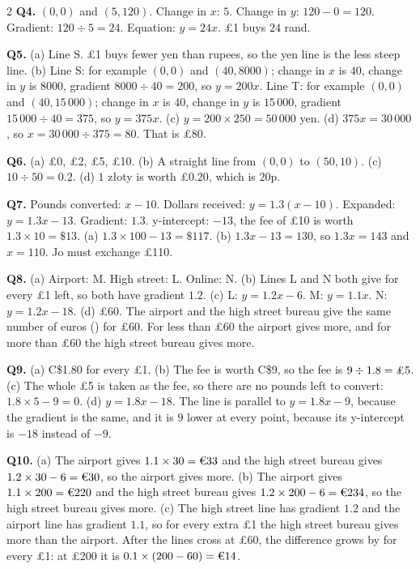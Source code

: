 \documentclass[12pt,a4paper]{article}
\newcommand{\zl}{z\l{}oty}
\begin{document}
{\begin{multicols}{2}
\textbf{Q4.} $(0,0)$ and $(5,120)$. Change in $x$: $5$. Change in $y$:
$120-0=120$. Gradient: $120\div5=24$. Equation: $y=24x$. \pounds1 buys $24$
rand.

\textbf{Q5.} (a) Line S. \pounds1 buys fewer yen than rupees, so the yen line
is the less steep line. \quad
(b) Line S: for example $(0,0)$ and $(40,8000)$; change in $x$ is $40$, change
in $y$ is $8000$, gradient $8000\div40=200$, so $y=200x$. Line T: for example
$(0,0)$ and $(40,15\,000)$; change in $x$ is $40$, change in $y$ is
$15\,000$, gradient $15\,000\div40=375$, so $y=375x$. \quad
(c) $y=200\times250=50\,000$ yen. \quad
(d) $375x=30\,000$, so $x=30\,000\div375=80$. That is \pounds80.

\textbf{Q6.} (a) \pounds0, \pounds2, \pounds5, \pounds10. \quad
(b) A straight line from $(0,0)$ to $(50,10)$. \quad
(c) $10\div50=0.2$. \quad
(d) $1$ \zl{} is worth \pounds0.20, which is $20$p.

\textbf{Q7.} Pounds converted: $x-10$. Dollars received: $y=1.3(x-10)$.
Expanded: $y=1.3x-13$. Gradient: $1.3$. y-intercept: $-13$, the fee of
\pounds10 is worth $1.3\times10=\$13$. \quad
(a) $1.3\times100-13=\$117$. \quad
(b) $1.3x-13=130$, so $1.3x=143$ and $x=110$. Jo must exchange \pounds110.

\textbf{Q8.} (a) Airport: M. High street: L. Online: N. \quad
(b) Lines L and N both give  for every \pounds1 left, so both have
gradient $1.2$. \quad
(c) L: $y=1.2x-6$. \quad M: $y=1.1x$. \quad N: $y=1.2x-18$. \quad
(d) \pounds60. The airport and the high street bureau give the same number of
euros () for \pounds60. For less than \pounds60 the airport gives
more, and for more than \pounds60 the high street bureau gives more.

\textbf{Q9.} (a) C\$1.80 for every \pounds1. \quad
(b) The fee is worth C\$9, so the fee is $9\div1.8=\text{\pounds}5$. \quad
(c) The whole \pounds5 is taken as the fee, so there are no pounds left to
convert: $1.8\times5-9=0$. \quad
(d) $y=1.8x-18$. The line is parallel to $y=1.8x-9$, because the gradient is
the same, and it is $9$ lower at every point, because its y-intercept is $-18$
instead of $-9$.

\textbf{Q10.} (a) The airport gives $1.1\times30=\text{\texteuro}33$ and
the high street bureau gives $1.2\times30-6=\text{\texteuro}30$, so the
airport gives more. \quad
(b) The airport gives $1.1\times200=\text{\texteuro}220$ and the high street
bureau gives $1.2\times200-6=\text{\texteuro}234$, so the high street bureau
gives  more. \quad
(c) The high street line has gradient $1.2$ and the airport line has
gradient $1.1$, so for every extra \pounds1 the high street bureau gives
 more than the airport. After the lines cross at \pounds60,
the difference grows by  for every \pounds1: at \pounds200 it
is $0.1\times(200-60)=\text{\texteuro}14$.


\end{multicols}}
\end{document}
